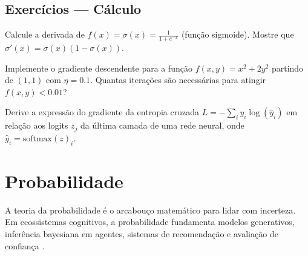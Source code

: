 \subsection{Exercícios — Cálculo}
\begin{exercicio}
Calcule a derivada de $f(x) = \sigma(x) = \frac{1}{1 + e^{-x}}$
(função sigmoide). Mostre que $\sigma'(x) = \sigma(x)(1 - \sigma(x))$.
\end{exercicio}
\begin{exercicio}
Implemente o gradiente descendente para a função
$f(x, y) = x^2 + 2y^2$ partindo de $(1, 1)$ com $\eta = 0.1$.
Quantas iterações são necessárias para atingir $f(x, y) < 0.01$?
\end{exercicio}
\begin{exercicio}
Derive a expressão do gradiente da entropia cruzada
$L = -\sum_i y_i \log(\hat{y}_i)$ em relação aos logits $z_j$ da última
camada de uma rede neural, onde $\hat{y}_i = \text{softmax}(z)_i$.
\end{exercicio}
\section{Probabilidade}
\label{sec:probabilidade}
\nivelintermediario
A teoria da probabilidade é o arcabouço matemático para lidar com
incerteza. Em ecossistemas cognitivos, a probabilidade fundamenta modelos
generativos, inferência bayesiana em agentes, sistemas de recomendação e
avaliação de confiança \cite{wasserman2004all, hastie2009elements,
russell2020inteligencia}.
